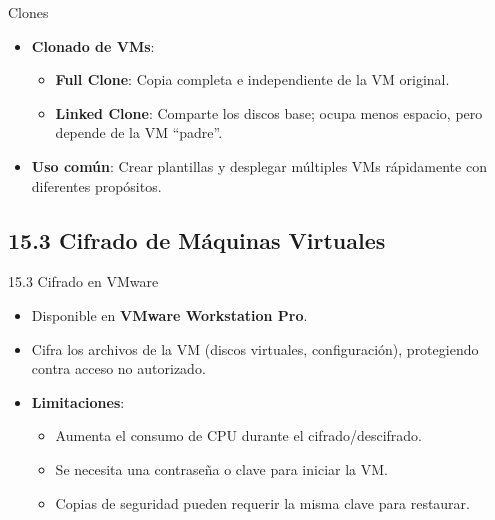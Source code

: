 \documentclass{beamer}
\begin{document}
\begin{frame}{Clones}
	\begin{itemize}
		\item \textbf{Clonado de VMs}:
			\begin{itemize}
				\item \textbf{Full Clone}: Copia completa e independiente de la VM original.
				\item \textbf{Linked Clone}: Comparte los discos base; ocupa menos espacio, pero depende de la VM “padre”.
			\end{itemize}
		\item \textbf{Uso común}: Crear plantillas y desplegar múltiples VMs rápidamente con diferentes propósitos.
	\end{itemize}
\end{frame}

\subsection{15.3 Cifrado de Máquinas Virtuales}
\begin{frame}{15.3 Cifrado en VMware}
	\begin{itemize}
		\item Disponible en \textbf{VMware Workstation Pro}.
		\item Cifra los archivos de la VM (discos virtuales, configuración), protegiendo contra acceso no autorizado.
		\item \textbf{Limitaciones}:
			\begin{itemize}
				\item Aumenta el consumo de CPU durante el cifrado/descifrado.
				\item Se necesita una contraseña o clave para iniciar la VM.
				\item Copias de seguridad pueden requerir la misma clave para restaurar.
			\end{itemize}
	\end{itemize}
\end{frame}

\end{document}
